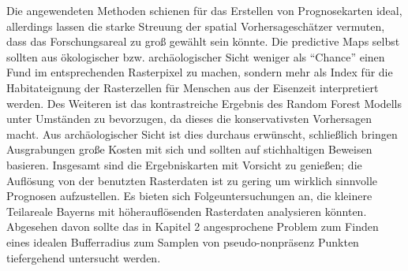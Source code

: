 Die angewendeten Methoden schienen für das Erstellen von Prognosekarten ideal, allerdings lassen die starke Streuung der spatial Vorhersageschätzer vermuten, dass das Forschungsareal zu groß gewählt sein könnte. Die predictive Maps selbst sollten  aus ökologischer bzw. archäologischer Sicht weniger als ``Chance'' einen Fund im entsprechenden Rasterpixel zu machen, sondern mehr als Index für die Habitateignung der Rasterzellen für Menschen aus der Eisenzeit interpretiert werden. Des Weiteren ist das kontrastreiche Ergebnis des Random Forest Modells unter Umständen zu bevorzugen, da dieses die konservativsten Vorhersagen macht. Aus archäologischer Sicht ist dies durchaus erwünscht, schließlich bringen Ausgrabungen große Kosten mit sich und sollten auf stichhaltigen Beweisen basieren. Insgesamt sind die Ergebniskarten mit Vorsicht zu genießen; die Auflösung von der benutzten Rasterdaten ist zu gering um wirklich sinnvolle Prognosen aufzustellen. Es bieten sich Folgeuntersuchungen an, die kleinere Teilareale Bayerns mit höherauflösenden Rasterdaten analysieren könnten. Abgesehen davon sollte das in Kapitel 2 angesprochene Problem zum Finden eines idealen Bufferradius zum Samplen von pseudo-nonpräsenz Punkten tiefergehend untersucht werden.